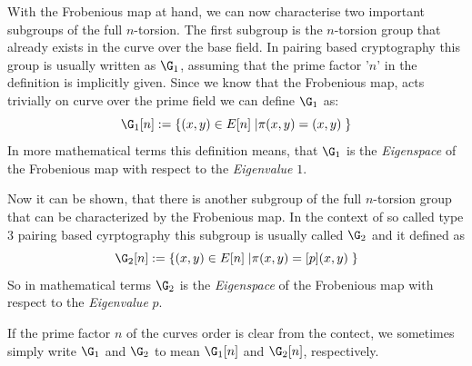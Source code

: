 With the Frobenious map at hand, we can now characterise two important subgroups of the full $n$-torsion. The first subgroup is the $n$-torsion group that already exists in the curve over the base field. In pairing based cryptography this group is usually written as $\G_1$, assuming that the prime factor '$n$' in the definition is implicitly given. Since we know that the Frobenious map, acts trivially on curve over the prime field we can define $\G_1$ as:
\begin{equation}
\G_1[n] := \{(x,y)\in E[n]\;| \pi(x,y) = (x,y)\;\}
\end{equation}
In more mathematical terms this definition means, that $\G_1$ is the \textit{Eigenspace} of the Frobenious map with respect to the \textit{Eigenvalue} $1$.

Now it can be shown, that there is another subgroup of the full $n$-torsion group that can be characterized by the Frobenious map. In the context of so called type $3$ pairing based cyrptography this subgroup is usually called $\G_2$ and it defined as 
\begin{equation}
\G_2[n] := \{(x,y)\in E[n]\;| \pi(x,y) = [p](x,y)\;\}
\end{equation}
So in mathematical terms $\G_2$ is the \textit{Eigenspace} of the Frobenious map with respect to the \textit{Eigenvalue} $p$.
\begin{notation}
If the prime factor $n$ of the curves order is clear from the contect, we sometimes simply write $\G_1$ and $\G_2$ to mean $\G_1[n]$ and $\G_2[n]$, respectively.
\end{notation}

